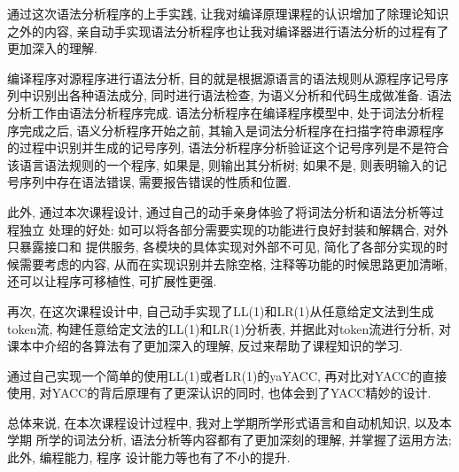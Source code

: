 通过这次语法分析程序的上手实践, 让我对编译原理课程的认识增加了除理论知识之外的内容, 
亲自动手实现语法分析程序也让我对编译器进行语法分析的过程有了更加深入的理解. \par

编译程序对源程序进行语法分析,
目的就是根据源语言的语法规则从源程序记号序列中识别出各种语法成分,
同时进行语法检查, 为语义分析和代码生成做准备. 语法分析工作由语法分析程序完成.
语法分析程序在编译程序模型中, 处于词法分析程序完成之后, 语义分析程序开始之前,
其输入是词法分析程序在扫描字符串源程序的过程中识别并生成的记号序列,
语法分析程序分析验证这个记号序列是不是符合该语言语法规则的一个程序, 如果是,
则输出其分析树; 如果不是, 则表明输入的记号序列中存在语法错误,
需要报告错误的性质和位置.\par

此外, 通过本次课程设计, 通过自己的动手亲身体验了将词法分析和语法分析等过程独立
处理的好处: 如可以将各部分需要实现的功能进行良好封装和解耦合, 对外只暴露接口和
提供服务, 各模块的具体实现对外部不可见, 简化了各部分实现的时候需要考虑的内容, 
从而在实现识别并去除空格, 注释等功能的时候思路更加清晰, 还可以让程序可移植性, 
可扩展性更强.\par

再次, 在这次课程设计中, 自己动手实现了LL(1)和LR(1)从任意给定文法到生成token流,
构建任意给定文法的LL(1)和LR(1)分析表, 并据此对token流进行分析,
对课本中介绍的各算法有了更加深入的理解, 反过来帮助了课程知识的学习.\par

通过自己实现一个简单的使用LL(1)或者LR(1)的yaYACC, 再对比对YACC的直接使用,
对YACC的背后原理有了更深认识的同时, 也体会到了YACC精妙的设计.\par

总体来说, 在本次课程设计过程中, 我对上学期所学形式语言和自动机知识, 以及本学期
所学的词法分析, 语法分析等内容都有了更加深刻的理解, 并掌握了运用方法; 此外, 编程能力, 程序
设计能力等也有了不小的提升.
